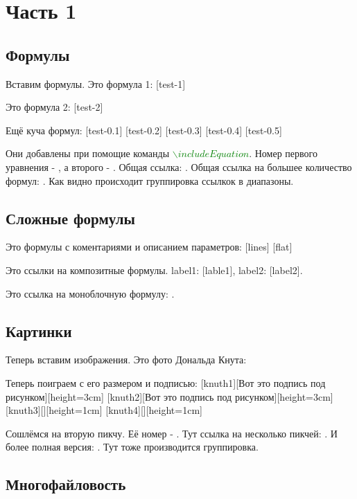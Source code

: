 \section{Часть 1}

\subsection{Формулы}
Вставим формулы.
Это формула 1:
[test-1]

Это формула 2:
[test-2]

Ещё куча формул:
[test-0.1]
[test-0.2]
[test-0.3]
[test-0.4]
[test-0.5]

Они добавлены при помощие команды \textcolor{green}{$\backslash includeEquation$}. 
Номер первого уравнения - , а второго - . Общая ссылка: .
Общая ссылка на большее количество формул: . Как видно происходит группировка ссылкок в диапазоны.
\pagebreak

\subsection{Сложные формулы}
Это формулы с коментариями и описанием параметров:
[lines]
[flat]

Это ссылки на композитные формулы. label1: [lable1], label2: [label2]. \par
Это ссылка на моноблочную формулу: .


\subsection{Картинки}
Теперь вставим изображения. Это фото Дональда Кнута:
\bigbreak

Теперь поиграем с его размером и подписью:
[knuth1][Вот это подпись под рисунком][height=3cm]\bigbreak
{}[knuth2][Вот это подпись под рисунком][height=3cm]\bigbreak
{}[knuth3][][height=1cm]\bigbreak
{}[knuth4][][height=1cm]\bigbreak

Сошлёмся на вторую пикчу. Её номер - . Тут ссылка на несколько пикчей: .
И более полная версия: . Тут тоже производится группировка.
\pagebreak

\subsection{Многофайловость}


